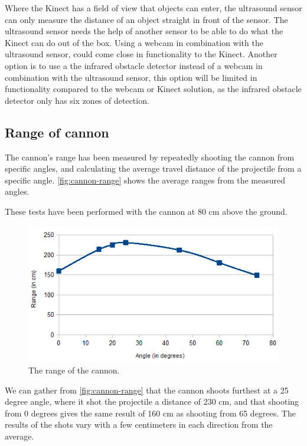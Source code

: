 Where the Kinect has a field of view that objects can enter, the ultrasound sensor can only measure the distance of an object straight in front of the sensor. The ultrasound sensor needs the help of another sensor to be able to do what the Kinect can do out of the box. Using a webcam in combination with the ultrasound sensor, could come close in functionality to the Kinect. Another option is to use a the infrared obstacle detector instead of a webcam in combination with the ultrasound sensor, this option will be limited in functionality compared to the webcam or Kinect solution, as the infrared obstacle detector only has six zones of detection.

\subsection{Range of cannon}
The cannon's range has been measured by repeatedly shooting the cannon from specific angles, and calculating the average travel distance of the projectile from a specific angle. \autoref{fig:cannon-range} shows the average ranges from the measured angles.

These tests have been performed with the cannon at 80 cm above the ground.

\begin{figure}[hbtp]
\includegraphics[width=\textwidth]{img/cannon-range.png}
\caption{The range of the cannon.} 
\label{fig:cannon-range} 
\end{figure}

We can gather from \autoref{fig:cannon-range} that the cannon shoots furthest at a 25 degree angle, where it shot the projectile a distance of 230 cm, and that shooting from 0 degrees gives the same result of 160 cm as shooting from 65 degrees. The results of the shots vary with a few centimeters in each direction from the average.

